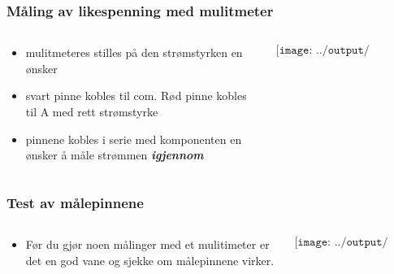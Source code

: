 \documentclass[aspectratio=169,xcolor=dvipsnames]{beamer}
\begin{document}
\begin{frame}
	\frametitle{Måling av likespenning med mulitmeter}

	\begin{columns}
		\begin{column}{0.3\textwidth}
			\begin{itemize}
				\item mulitmeteres stilles på den strømstyrken en ønsker
				\item svart pinne kobles til com. Rød pinne kobles til A med rett strømstyrke
				\item pinnene kobles i serie med komponenten en ønsker å måle strømmen \textbf{\textit{igjennom}}
			\end{itemize}
		\end{column}

		\begin{column}{0.5\textwidth}
			$$\texttt{[image: ../output/noGPLimages/tifel16.png]}$$
		\end{column}
	\end{columns}
\end{frame}

\begin{frame}
	\frametitle{Test av målepinnene}

	\begin{columns}
		\begin{column}{0.3\textwidth}
			\begin{itemize}
				\item Før du gjør noen målinger med et mulitimeter er det en god vane og sjekke om målepinnene virker.
			\end{itemize}
		\end{column}

		\begin{column}{0.7\textwidth}
			$$\texttt{[image: ../output/noGPLimages/tifel17.png]}$$
		\end{column}
	\end{columns}
\end{frame}
\end{document}
